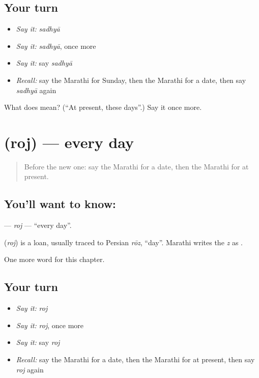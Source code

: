 \subsection*{Your turn}
\begin{itemize}
\raggedright
  \item \emph{Say it:} \emph{sadhyā}
  \item \emph{Say it:} \emph{sadhyā}, once more
  \item \emph{Say it:} say \emph{sadhyā}
  \item \emph{Recall:} say the Marathi for Sunday, then the Marathi for a date, then say \emph{sadhyā} again
\end{itemize}

\begin{tcolorbox}[breakable,colback=teal!4,colframe=teal!35!black,title={Before you move on}]
What does  mean? (\textquotedblleft{}At present, these days\textquotedblright{}.) Say it once more.
\end{tcolorbox}
\section[\texorpdfstring{\mr{रोज} (roj)}{रोज (roj)}]{ (roj) — every day}

\label{lesson:MR-C126-roj}



\begin{quote}
Before the new one: say the Marathi for a date, then the Marathi for at present.
\end{quote}

\subsection*{You'll want to know: }
\textbf{} — \emph{roj} — \textquotedblleft{}every day\textquotedblright{}.

\begin{cousinweb}
\textbf{} (\emph{roj}) is a loan, usually traced to Persian \emph{rōz}, \textquotedblleft{}day\textquotedblright{}. Marathi writes the \emph{z} as \textbf{}.
\end{cousinweb}

\begin{grammarlens}[title={What you've built}]
One more word for this chapter.
\end{grammarlens}

\subsection*{Your turn}
\begin{itemize}
\raggedright
  \item \emph{Say it:} \emph{roj}
  \item \emph{Say it:} \emph{roj}, once more
  \item \emph{Say it:} say \emph{roj}
  \item \emph{Recall:} say the Marathi for a date, then the Marathi for at present, then say \emph{roj} again
\end{itemize}

